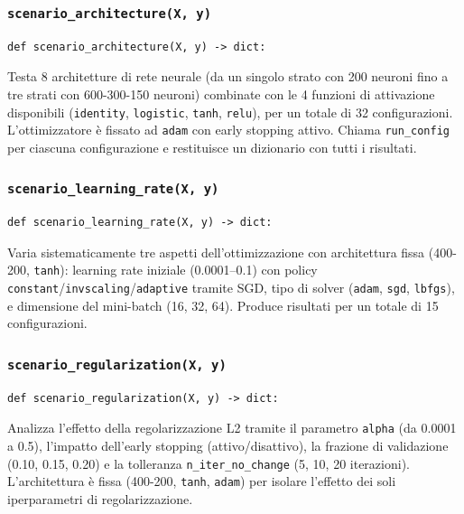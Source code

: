\documentclass[11pt,a4paper]{article}
\begin{document}
\subsubsection{\texttt{scenario\_architecture(X, y)}}

\begin{lstlisting}
def scenario_architecture(X, y) -> dict:
\end{lstlisting}
Testa 8 architetture di rete neurale (da un singolo strato con 200 neuroni fino a tre strati con 600-300-150 neuroni) 
combinate con le 4 funzioni di attivazione disponibili (\texttt{identity}, \texttt{logistic}, \texttt{tanh}, \texttt{relu}),
 per un totale di 32 configurazioni. L'ottimizzatore è fissato ad \texttt{adam} con early stopping attivo. Chiama \texttt{run\_config} 
 per ciascuna configurazione e restituisce un dizionario con tutti i risultati.

\subsubsection{\texttt{scenario\_learning\_rate(X, y)}}

\begin{lstlisting}
def scenario_learning_rate(X, y) -> dict:
\end{lstlisting}

Varia sistematicamente tre aspetti dell'ottimizzazione con architettura fissa (400-200, \texttt{tanh}): 
learning rate iniziale (0.0001--0.1) con policy \texttt{constant}/\texttt{invscaling}/\texttt{adaptive} 
tramite SGD, tipo di solver (\texttt{adam}, \texttt{sgd}, \texttt{lbfgs}), e dimensione del mini-batch (16, 32, 64). 
Produce risultati per un totale di 15 configurazioni.


\subsubsection{\texttt{scenario\_regularization(X, y)}}

\begin{lstlisting}
def scenario_regularization(X, y) -> dict:
\end{lstlisting}
Analizza l'effetto della regolarizzazione L2 tramite il parametro \texttt{alpha} (da 0.0001 a 0.5), 
l'impatto dell'early stopping (attivo/disattivo), la frazione di validazione (0.10, 0.15, 0.20) e la tolleranza 
\texttt{n\_iter\_no\_change} (5, 10, 20 iterazioni). L'architettura è fissa (400-200, \texttt{tanh}, \texttt{adam}) 
per isolare l'effetto dei soli iperparametri di regolarizzazione.
\end{document}
